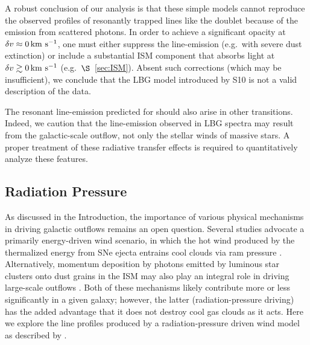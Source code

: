 \documentclass[12pt,preprint]{aastex}
\begin{document}
A robust conclusion of our
analysis is that these simple models cannot reproduce the
observed profiles of resonantly trapped lines like the 
doublet because of the emission from scattered photons.  In order to
achieve a significant opacity at $\delta v \approx 0 \, {\rm km~s^{-1}}$, one must
either suppress the line-emission (e.g.\ with severe dust extinction) 
or include a substantial ISM component that absorbs light at $\delta v
\gtrsim 0 \, {\rm km~s^{-1}}$ (e.g.\ $\S$~\ref{sec:ISM}).  
Absent such corrections (which may be insufficient),
we conclude that the LBG model
introduced by S10 is not a valid description of the data.

The resonant line-emission predicted for  should also arise
in other transitions.  Indeed, we caution that the 
line-emission observed in LBG spectra
\citep[e.g.][]{prs+02} may result from the galactic-scale outflow, not
only the stellar winds of massive stars.
A proper treatment of these radiative transfer effects is required to
quantitatively analyze these features.

\subsection{Radiation Pressure}
\label{sec:radiative}

As discussed in the Introduction, the importance of various physical mechanisms
in driving galactic outflows remains an open
question.  Several studies advocate a primarily energy-driven
wind scenario, in which the hot wind produced by the thermalized
energy from SNe ejecta entrains cool clouds via ram pressure \citep[e.g.][]{cc85,ham90,sh09}.
Alternatively, momentum deposition by photons emitted by luminous star clusters onto
dust grains in the ISM may also play an integral role in driving
large-scale outflows \citep[e.g.][]{mqt05,mmt10}.  Both of these
mechanisms likely contribute more or less significantly in a given
galaxy; however, the latter (radiation-pressure driving) has the added
advantage that it does not destroy cool gas clouds as it acts.  Here
we explore the line profiles produced by a radiation-pressure driven
wind model as described by \cite{mqt05}.
\end{document}
